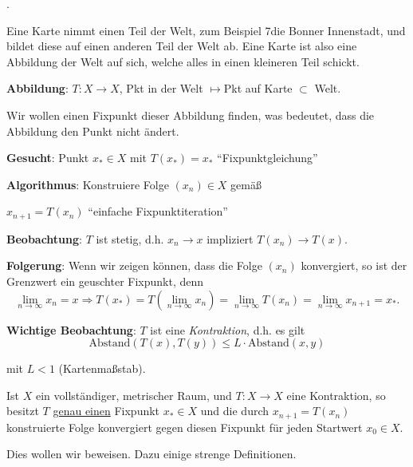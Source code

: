 \documentclass[a4paper,10pt]{article}
\begin{document}
    \def\svgwidth{\columnwidth}
    


.

Eine Karte nimmt einen Teil der Welt, zum Beispiel 7die Bonner Innenstadt,
und bildet diese auf einen anderen Teil der Welt ab. Eine Karte ist also eine
Abbildung der Welt auf sich, welche alles in einen kleineren Teil schickt.

\vspace{.5cm}

{\textbf{Abbildung}}:  $T: X \to X$,  
			          Pkt in der Welt $ \mapsto $Pkt auf Karte
			       $\subset $ Welt.

\vspace{.5cm}		       
Wir wollen einen Fixpunkt dieser Abbildung finden, was bedeutet, dass die Abbildung 
den Punkt nicht ändert.

\vspace{.5cm}		       
 {\textbf{Gesucht}}: Punkt  $x_* \in X$  mit
 $\boxed{T(x_*) = x_*}$ ``Fixpunktgleichung''
\vspace{.5cm}		       
 

 {\textbf{Algorithmus}}: Konstruiere Folge  $(x_n) \in X$  gemäß 
  
    \hspace{2cm} $\boxed{x_{n+1} = T(x_n)}$ ``einfache Fixpunktiteration''
\vspace{.5cm}		       


{\textbf{Beobachtung}}: $T$ ist stetig, d.h. $x_n \to x$ impliziert $T(x_n) \to T(x)$.

\vspace{.5cm}		       

{\textbf{Folgerung}}: Wenn wir zeigen können, dass die Folge $(x_n)$ konvergiert,
so ist der Grenzwert ein geuschter Fixpunkt, denn
\[
 \lim_{n \to \infty} x_n = x \Rightarrow T(x_*) = T(\lim_{n \to \infty} x_n) =
 \lim_{n \to \infty} T(x_n) = \lim_{n \to \infty} x_{n+1} = x_*.
\]


\textbf{Wichtige Beobachtung}: $T$ ist eine \textit{Kontraktion}, d.h. es gilt
\[
 \text{Abstand}(T(x), T(y)) \leq L \cdot \text{Abstand}(x, y)
\]

mit $L < 1$ (Kartenmaßstab).


\begin{thrm*}

Ist $X$ ein vollständiger, metrischer Raum, und $T: X\to X$ eine Kontraktion, so besitzt $T$
\underline{genau einen} Fixpunkt $x_* \in X$ und die durch $x_{n+1} = T(x_n)$ konstruierte Folge
konvergiert gegen diesen Fixpunkt für jeden Startwert $x_0 \in X$.
\end{thrm*}
Dies wollen wir beweisen. Dazu einige strenge Definitionen.
\end{document}
